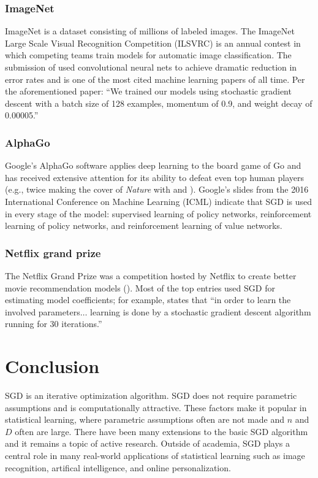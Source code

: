 \documentclass{report}
\begin{document}
\subsection{ImageNet}
ImageNet is a dataset consisting of millions
of labeled images. The
		ImageNet Large Scale Visual Recognition Competition (ILSVRC) is
		an annual contest in which competing teams train models for
		automatic image classification. The submission of \cite{krizhevsky2012imagenet} used convolutional neural
		nets to achieve dramatic reduction in error rates and is
		one of the most cited machine learning papers of all time. Per the aforementioned paper: ``We
		trained our models using stochastic gradient descent with a
		batch size of 128 examples, momentum of 0.9, and weight decay of
		0.00005.''
\subsection{AlphaGo}
Google's AlphaGo software applies deep learning to the
		board game of Go and has received extensive attention for its
		ability to defeat even top human players (e.g., twice making the
		cover of \textit{Nature} with \cite{silver2016mastering} and
		\cite{silver2017mastering}). Google's slides from the 2016
		International Conference on Machine Learning (ICML) indicate
		that SGD is used in every stage of the
		model: supervised learning of policy networks, reinforcement
		learning of policy networks, and reinforcement learning of value
		networks.

\subsection{Netflix grand prize}
The Netflix Grand Prize was a competition hosted by
		Netflix to create better movie recommendation models
		(\cite{bennett2007netflix}). Most of the top entries used
		SGD for estimating model coefficients; for example,
		\cite{koren2009bellkor} states that ``in order to learn the
		involved parameters$\ldots$ learning is done by a stochastic
		gradient descent algorithm running for 30 iterations.'' 

\chapter{Conclusion}

SGD is an iterative optimization algorithm. SGD does not require parametric
assumptions and is computationally attractive. These factors make it popular 
in statistical learning, where parametric assumptions often are not made and $n$
and $D$ often are large. There have been many extensions to the basic
SGD algorithm and it remains a topic of active research. Outside of academia,
SGD plays a central role in many real-world applications of statistical learning
such as image recognition, artifical intelligence, and online personalization.

\newpage

\printbibliography[heading=bibnumbered]
\end{document}
